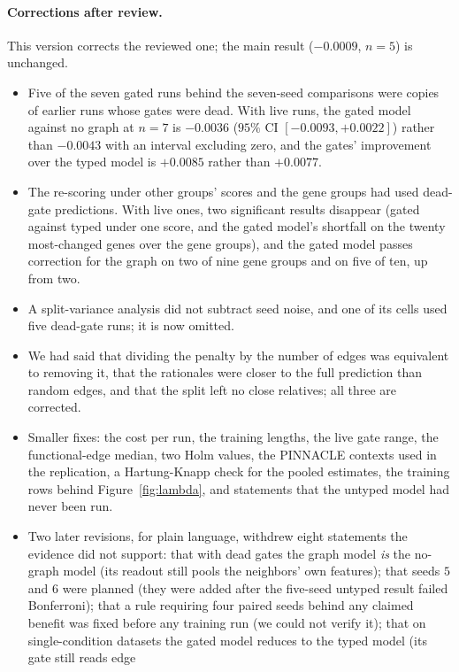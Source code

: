 \documentclass{article}
\begin{document}
\paragraph{Corrections after review.} This version corrects the reviewed one; the main result ($-0.0009$,
$n{=}5$) is unchanged.
\begin{itemize}
\setlength{\itemsep}{0pt}
\item Five of the seven gated runs behind the seven-seed comparisons were copies of earlier runs whose
gates were dead. With
live runs, the gated model against no graph at $n{=}7$ is $-0.0036$ ($95\%$ CI $[-0.0093,+0.0022]$) rather
than $-0.0043$ with an interval excluding zero, and the gates' improvement over the typed model is
$+0.0085$ rather than $+0.0077$.
\item The re-scoring under other groups' scores and the gene groups had used dead-gate predictions. With
live ones, two significant results disappear (gated against typed under one score, and the gated model's
shortfall on the twenty most-changed genes over the gene groups), and the gated model passes correction
for the graph on two of nine gene groups and on five of ten, up from two.
\item A split-variance analysis did not subtract seed noise, and one of its cells used five dead-gate
runs; it is now omitted.
\item We had said that dividing the penalty by the number of edges was equivalent to removing it, that the
rationales were closer to the full prediction than random edges, and that the split left no close
relatives; all three are corrected.
\item Smaller fixes: the cost per run, the training lengths, the live gate range, the functional-edge
median, two Holm values, the PINNACLE contexts used in the replication, a Hartung-Knapp check for the
pooled estimates, the training rows behind Figure~\ref{fig:lambda}, and statements that the untyped model
had never been run.
\item Two later revisions, for plain language, withdrew eight statements the evidence did not support:
that with dead gates the graph model \emph{is} the no-graph model (its readout still pools the neighbors'
own features); that seeds $5$ and $6$ were planned (they were added after the five-seed untyped result
failed Bonferroni); that a rule requiring four paired seeds behind any claimed benefit was fixed before
any training run (we could not verify it); that
on single-condition datasets the gated model reduces to the typed model (its gate still reads edge

\end{itemize}
\end{document}
